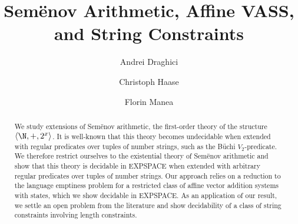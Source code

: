 \documentclass[UKenglish,cleveref, autoref, thm-restate]{lipics-v2021}
\title{Sem{\"e}nov Arithmetic, Affine {VASS}, and String Constraints}
\author{Andrei Draghici}{Department of Computer Science, University of Oxford, Oxford, United Kingdom}{andrei.draghici@cs.ox.ac.uk}{}{}
\author{Christoph Haase}{Department of Computer Science, University of Oxford, Oxford, United Kingdom}{christoph.haase@cs.ox.ac.uk}{}{}
\author{Florin Manea}{Computer Science Department and Campus-Institut Data Science, G{\"o}ttingen University, Germany}{florin.manea@informatik.uni-goettingen.de}{}{}
\begin{document}
\DeclarePairedDelimiter{\ceil}{\lceil}{\rceil}
\DeclarePairedDelimiter\floor{\lfloor}{\rfloor}







\maketitle

\begin{abstract}
  We study extensions of Sem{\"e}nov arithmetic, the first-order
  theory of the structure $\langle \N,+,2^x\rangle$. It is well-known
  that this theory becomes undecidable when extended with regular
  predicates over tuples of number strings, such as the B\"uchi
  $V_2$-predicate. We therefore restrict ourselves to the existential
  theory of Sem{\"e}nov arithmetic and show that this theory is
  decidable in EXPSPACE when extended with arbitrary regular
  predicates over tuples of number strings. Our approach relies on a
  reduction to the language emptiness problem for a restricted class
  of affine vector addition systems with states, which we show
  decidable in EXPSPACE. As an application of our result, we settle an
  open problem from the literature and show decidability of a class of
  string constraints involving length constraints.
\end{abstract}
\end{document}
